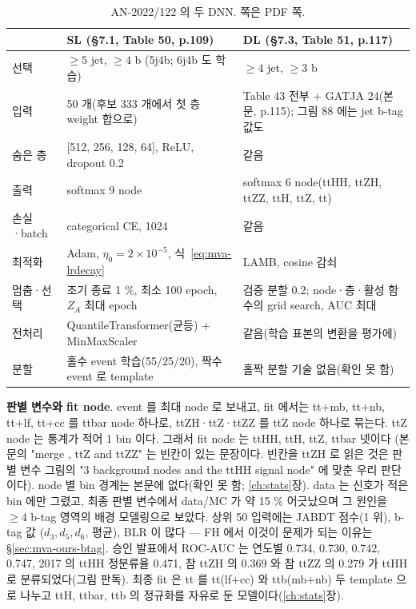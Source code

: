\begin{table}[htbp]
\centering
\caption{AN-2022/122 의 두 DNN. 쪽은 PDF 쪽.}
\label{tab:mva-an-dnn}
\small
\begin{tabularx}{\linewidth}{@{}l L L@{}}
\toprule
 & SL (§7.1, Table 50, p.109) & DL (§7.3, Table 51, p.117) \\
\midrule
선택 & $\ge5$ jet, $\ge4$ b (5j4b; 6j4b 도 학습) & $\ge4$ jet, $\ge3$ b \\
입력 & 50 개(후보 333 개에서 첫 층 weight 합으로) & Table 43 전부 + GATJA 24(본문, p.115); 그림 88 에는 jet b-tag 값도 \\
숨은 층 & [512, 256, 128, 64], ReLU, dropout 0.2 & 같음 \\
출력 & softmax 9 node & softmax 6 node(ttHH, ttZH, ttZZ, ttH, ttZ, tt) \\
손실·batch & categorical CE, 1024 & 같음 \\
최적화 & Adam, $\eta_0=2\times10^{-5}$, 식~\eqref{eq:mva-lrdecay} & LAMB, cosine 감쇠 \\
멈춤·선택 & 조기 종료 1 \%, 최소 100 epoch, $Z_A$ 최대 epoch & 검증 분할 0.2; node·층·활성 함수의 grid search, AUC 최대 \\
전처리 & QuantileTransformer(균등) + MinMaxScaler & 같음(학습 표본의 변환을 평가에) \\
분할 & 홀수 event 학습(55/25/20), 짝수 event 로 template & 홀짝 분할 기술 없음(확인 못 함) \\
\bottomrule
\end{tabularx}
\end{table}

\textbf{판별 변수와 fit node}. event 를 최대 node 로 보내고, fit 에서는 tt+mb, tt+nb, tt+lf, tt+cc 를 ttbar node 하나로, ttZH·ttZ·ttZZ 를 ttZ node
하나로 묶는다. ttZ node 는 통계가 적어 1 bin 이다. 그래서 fit node 는 ttHH, ttH, ttZ, ttbar 넷이다
(본문의 "merge , ttZ and ttZZ" 는 빈칸이 있는 문장이다. 빈칸을 ttZH 로 읽은 것은 판별 변수 그림의 "3 background nodes and the ttHH signal node"
에 맞춘 우리 판단이다). node 별 bin 경계는 본문에 없다(확인 못 함; \ref{ch:stats}장). data 는 신호가 적은 bin 에만 그렸고, 최종 판별 변수에서 data/MC 가 약 15 \% 어긋났으며
그 원인을 $\ge4$ b-tag 영역의 배경 모델링으로 보았다. 상위 50 입력에는 JABDT 점수(1 위), b-tag 값
($d_3, d_5, d_6$, 평균), BLR 이 많다 — FH 에서 이것이 문제가 되는 이유는 \S\ref{sec:mva-ours-btag}.
승인 발표에서 ROC-AUC 는 연도별 0.734, 0.730, 0.742, 0.747, 2017 의 ttHH 정분류율 0.471, 참 ttZH 의 0.369 와 참 ttZZ 의 0.279 가 ttHH 로
분류되었다(그림 판독). 최종 fit 은 tt 를 tt(lf+cc) 와 ttb(mb+nb) 두 template 으로 나누고 ttH, ttbar, ttb 의 정규화를
자유로 둔 모델이다(\ref{ch:stats}장).

